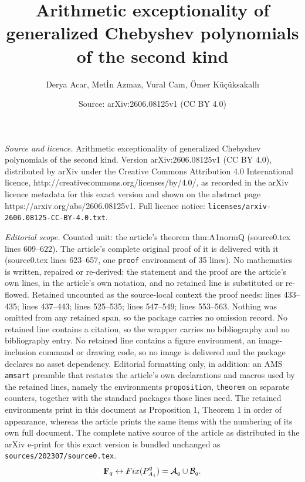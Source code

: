 \documentclass[10pt,a4paper]{amsart}
\title{Arithmetic exceptionality of generalized Chebyshev polynomials of the second kind}
\author{Derya Acar, Met\.{I}n Azmaz, Vural Cam, Ömer Küçüksakallı}
\date{Source: arXiv:2606.08125v1 (CC BY 4.0)}
\newcommand{\F}{\mathbf F}
\newcommand{\Fix}{\textnormal{Fix}}
\newcommand{\mc}{\mathcal}
\begin{document}
\maketitle

\noindent\emph{Source and licence.} Arithmetic exceptionality of generalized Chebyshev polynomials of the second kind. Version arXiv:2606.08125v1 (CC BY 4.0), distributed by arXiv under the Creative Commons Attribution 4.0 International licence, http://creativecommons.org/licenses/by/4.0/, as recorded in the arXiv licence metadata for this exact version and shown on the abstract page https://arxiv.org/abs/2606.08125v1. Full licence notice: \texttt{licenses/arxiv-2606.08125-CC-BY-4.0.txt}.\par\smallskip

\noindent\textit{Editorial scope.} Counted unit: the article's theorem thm:A1normQ (source0.tex lines 609--622). The article's complete original proof of it is delivered with it (source0.tex lines 623--657, one \texttt{proof} environment of 35 lines). No mathematics is written, repaired or re-derived: the statement and the proof are the article's own lines, in the article's own notation, and no retained line is substituted or re-flowed.  Retained uncounted as the source-local context the proof needs: lines 433--435; lines 437--443; lines 525--535; lines 547--549; lines 553--563.  Nothing was omitted from any retained span, so the package carries no omission record.  No retained line contains a citation, so the wrapper carries no bibliography and no bibliography entry.  No retained line contains a figure environment, an image-inclusion command or drawing code, so no image is delivered and the package declares no asset dependency.  Editorial formatting only, in addition: an AMS \texttt{amsart} preamble that restates the article's own declarations and macros used by the retained lines, namely the environments \texttt{proposition}, \texttt{theorem} on separate counters, together with the standard packages those lines need.  The retained environments print in this document as Proposition 1, Theorem 1 in order of appearance, whereas the article prints the same items with the numbering of its own full document.  The complete native source of the article as distributed in the arXiv e-print for this exact version is bundled unchanged as \texttt{sources/202307/source0.tex}.
\begin{equation}\label{eq:one-to-one}
	\F_q \leftrightarrow \Fix(P_{A_{1}}^{q}) = \mc{A}_{q} \cup \mc{B}_{q}.
\end{equation}
\end{document}
